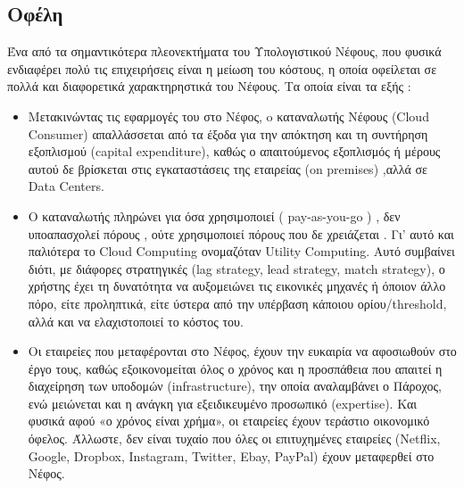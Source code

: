 \documentclass{article}
\begin{document}
\subsection{Οφέλη}
Ένα από τα σημαντικότερα πλεονεκτήματα του Υπολογιστικού Νέφους, που φυσικά ενδιαφέρει πολύ τις επιχειρήσεις είναι η μείωση του κόστους, η οποία οφείλεται σε πολλά και διαφορετικά χαρακτηρηστικά του Νέφους. Τα οποία είναι τα εξής :
\begin{itemize}
\item	Μετακινώντας τις εφαρμογές του στο Νέφος, o καταναλωτής Νέφους (Cloud Consumer) απαλλάσσεται από τα έξοδα για την απόκτηση και τη συντήρηση εξοπλισμού (capital expenditure), καθώς ο απαιτούμενος εξοπλισμός ή μέρους αυτού δε βρίσκεται στις εγκαταστάσεις της εταιρείας (on premises) ,αλλά σε Data Centers.

\item	Ο καταναλωτής πληρώνει για όσα χρησιμοποιεί ( pay-as-you-go ) , δεν υποαπασχολεί πόρους , ούτε χρησιμοποιεί πόρους που δε χρειάζεται . Γι’ αυτό και παλιότερα το Cloud Computing ονομαζόταν Utility Computing. Αυτό συμβαίνει διότι, με διάφορες στρατηγικές (lag strategy, lead strategy, match strategy), ο χρήστης έχει τη δυνατότητα να αυξομειώνει τις εικονικές μηχανές ή όποιον άλλο πόρο, είτε προληπτικά, είτε ύστερα από την υπέρβαση κάποιου ορίου/threshold, αλλά και να ελαχιστοποιεί το κόστος του.

\item	Οι εταιρείες που μεταφέρονται στο Νέφος, έχουν την ευκαιρία να αφοσιωθούν στο έργο τους, καθώς εξοικονομείται όλος ο χρόνος και η προσπάθεια που απαιτεί η διαχείρηση των υποδομών (infrastructure), την οποία αναλαμβάνει ο Πάροχος, ενώ μειώνεται και η ανάγκη για εξειδικευμένο προσωπικό (expertise). Και φυσικά αφού «ο χρόνος είναι χρήμα», οι εταιρείες έχουν τεράστιο οικονομικό όφελος. Άλλωστε, δεν είναι τυχαίο που όλες οι επιτυχημένες εταιρείες (Netflix, Google, Dropbox, Instagram, Twitter, Ebay, PayPal) έχουν μεταφερθεί στο Νέφος.


\end{itemize}
\end{document}
